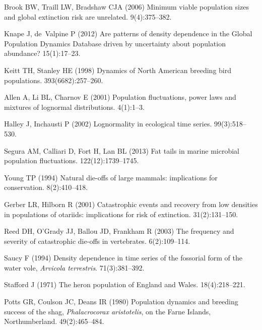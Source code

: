 \documentclass[9pt,twocolumn,twoside]{pnas-new}
\begin{document}
\begin{thebibliography}{10}
Brook BW, Traill LW, Bradshaw CJA (2006) Minimum viable population sizes and
  global extinction risk are unrelated.
 9(4):375--382.

Knape J, de~Valpine P (2012) Are patterns of density dependence in the {Global
  Population Dynamics Database} driven by uncertainty about population
  abundance?
 15(1):17--23.

Keitt TH, Stanley HE (1998) Dynamics of {North American} breeding bird
  populations.
 393(6682):257--260.

Allen A, Li BL, Charnov E (2001) Population fluctuations, power laws and
  mixtures of lognormal distributions.
 4(1):1--3.

Halley J, Inchausti P (2002) Lognormality in ecological time series.
 99(3):518--530.

Segura AM, Calliari D, Fort H, Lan BL (2013) Fat tails in marine microbial
  population fluctuations.
 122(12):1739--1745.

Young TP (1994) Natural die-offs of large mammals: implications for
  conservation.
 8(2):410--418.

Gerber LR, Hilborn R (2001) Catastrophic events and recovery from low densities
  in populations of otariids: implications for risk of extinction.
 31(2):131--150.

Reed DH, O'Grady JJ, Ballou JD, Frankham R (2003) The frequency and severity of
  catastrophic die-offs in vertebrates.
 6(2):109--114.

Saucy F (1994) Density dependence in time series of the fossorial form of the
  water vole, \textit{Arvicola terrestris}.
 71(3):381--392.

Stafford J (1971) The heron population of {England} and {Wales}.
 18(4):218--221.

Potts GR, Coulson JC, Deans IR (1980) Population dynamics and breeding success
  of the shag, \textit{Phalacrocorax aristotelis}, on the {Farne Islands},
  {Northumberland}.
 49(2):465--484.


\end{thebibliography}
\end{document}
